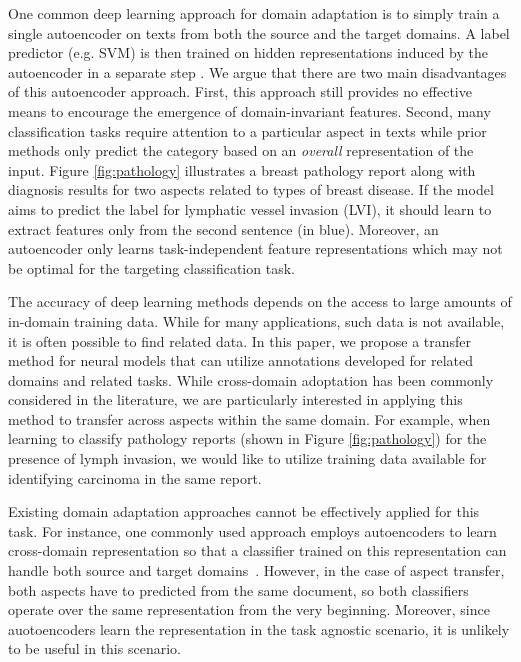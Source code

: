 One common deep learning approach for domain adaptation is to simply train a single autoencoder on texts from both the source and the target domains. A label predictor (e.g. SVM) is then trained on hidden representations induced by the autoencoder in a separate step \cite{glorot2011domain,chen2012marginalized,chopra2013dlid}. We argue that there are two main disadvantages of this autoencoder approach. First, this approach still provides no effective means to encourage the emergence of domain-invariant features.  Second, many classification tasks require attention to a particular aspect in texts while prior methods only predict the category based on an \emph{overall} representation of the input. Figure \ref{fig:pathology} illustrates a breast pathology report along with diagnosis results for two aspects related to types of breast disease. If the model aims to predict the label for lymphatic vessel invasion (LVI), it should learn to extract features only from the second sentence (in blue). Moreover, an autoencoder only learns task-independent feature representations which may not be optimal for the targeting classification task.


The accuracy of deep learning methods depends on the access to large amounts of in-domain training data. While for many applications, such data is not available, it is often possible to find related data. In this paper, we propose a transfer method for neural models that can utilize annotations developed for related domains and related tasks. 
While cross-domain adoptation has been commonly considered in the literature, we are particularly interested in applying this method to transfer across aspects within the same domain. For example, when learning to classify pathology reports (shown in Figure \ref{fig:pathology}) for the presence of lymph invasion, we would like to utilize training data available for identifying carcinoma in the same report. %

Existing domain adaptation approaches cannot be effectively applied for this task. For instance, one commonly used approach employs autoencoders to learn cross-domain representation so that a classifier trained on this representation can handle both source and target domains~\cite{glorot2011domain,chen2012marginalized,chopra2013dlid}. However, in the case of aspect transfer, both aspects have to predicted from the same document, so both classifiers operate over the same representation from the very beginning. Moreover, since auotoencoders learn the representation in the task agnostic scenario, it is unlikely to be useful in this scenario. 

